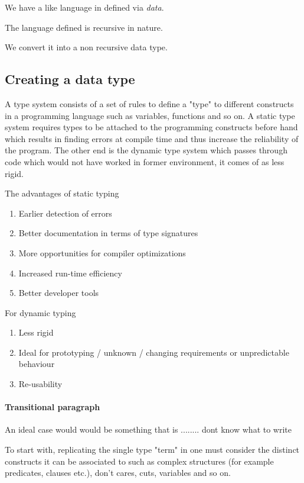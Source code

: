 \documentclass[proposal.tex]{subfiles}
\begin{document}
We have a  like language in  defined via \textit{data}.

The language defined is recursive in nature. 

We convert it into a non recursive data type.


  


\subsection{Creating a data type}

A type system consists of a set of rules to define a "type" to different constructs in a programming language such as variables, functions 
and so on. A static type system requires types to be attached to the programming constructs before hand which results in finding errors at 
compile time and thus increase the reliability of the program. The other end is the dynamic type system which passes through code which 
would not have worked in former environment, it comes of as less rigid.

The advantages of static typing \cite{meijer2004static}
\begin{enumerate}
\item Earlier detection of errors
\item Better documentation in terms of type signatures
\item More opportunities for compiler optimizations
\item Increased run-time efficiency
\item Better developer tools 
\end{enumerate}          

For dynamic typing
\begin{enumerate}
\item Less rigid
\item Ideal for prototyping / unknown / changing requirements or unpredictable behaviour 
\item Re-usability  
\end{enumerate}

\paragraph{Transitional paragraph}
An ideal case would would be something that is ........ dont know what to write


To start with, replicating the single type "term" in  one must consider the distinct constructs it can be associated to 
such as complex structures (for example predicates, clauses etc.), don't cares, cuts, variables and so on.
\end{document}
